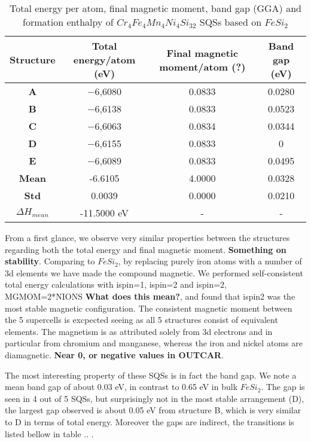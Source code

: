 \begin{table}[H]
\centering
\begin{tabular}{@{}cccc@{}}
\toprule
Structure  & Total energy/atom (eV) & Final magnetic moment/atom (?) & Band gap (eV) \\ \midrule
\textbf{A} & −6,6080                & 0.0833                    & 0.0280        \\
\textbf{B} & −6,6138                & 0.0833                    & 0.0523        \\
\textbf{C} & −6,6063                & 0.0834                    & 0.0344        \\
\textbf{D} & −6,6155                & 0.0833                    & 0             \\
\textbf{E} & −6,6089                & 0.0833                    & 0.0495        \\ \midrule
\textbf{Mean} & -6.6105 & 4.0000 & 0.0328    \\
\textbf{Std} & 0.0039 &  0.0000 &  0.0210 \\
\textbf{$\Delta H_{mean}$} & -11.5000 eV & - & - \\ \bottomrule
\end{tabular}
\caption{Total energy per atom, final magnetic moment, band gap (GGA) and formation enthalpy of $Cr_4Fe_4Mn_4Ni_4Si_{32}$ SQSs based on $FeSi_2$}
\label{table:fesi2_summary}
\end{table}  

From a first glance, we observe very similar properties between the structures regarding both the total energy and final magnetic moment. \textbf{Something on stability}. Comparing to $FeSi_2$, by replacing purely iron atoms with a number of 3d elements we have made the compound magnetic. We performed self-consistent total energy calculations with ispin=1, ispin=2 and ispin=2, MGMOM=2*NIONS \textbf{What does this mean?}, and found that ispin2 was the most stable magnetic configuration. The consistent magnetic moment between the 5 supercells is excpected seeing as all 5 structures consist of equivalent elements. The magnetism is as attributed solely from 3d electrons and in particular from chromium and manganese, whereas the iron and nickel atoms are diamagnetic. \textbf{Near 0, or negative values in OUTCAR}. 
 
The most interesting property of these SQSs is in fact the band gap. We note a mean band gap of about 0.03 eV, in contrast to 0.65 eV in bulk $FeSi_2$. The gap is seen in 4 out of 5 SQSs, but surprisingly not in the most stable arrangement (D), the largest gap observed is about 0.05 eV from structure B, which is very similar to D in terms of total energy. Moreover the gaps are indirect, the transitions is listed bellow in table .. .     


